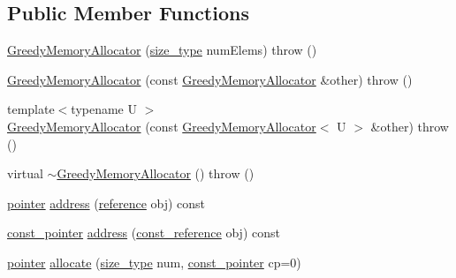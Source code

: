 \subsection*{Public Member Functions}
\begin{DoxyCompactItemize}
\item 
\hyperlink{classuva_1_1smt_1_1tries_1_1alloc_1_1_greedy_memory_allocator_ae87e1efb69523a746d42c2bdff324b6a}{Greedy\+Memory\+Allocator} (\hyperlink{classuva_1_1smt_1_1tries_1_1alloc_1_1_greedy_memory_allocator_a76d81ff5df20ef0404bb2027016b8b2d}{size\+\_\+type} num\+Elems)  throw ()
\item 
\hyperlink{classuva_1_1smt_1_1tries_1_1alloc_1_1_greedy_memory_allocator_a3c3e41759b86df79ce3321386b8dafcd}{Greedy\+Memory\+Allocator} (const \hyperlink{classuva_1_1smt_1_1tries_1_1alloc_1_1_greedy_memory_allocator}{Greedy\+Memory\+Allocator} \&other)  throw ()
\item 
{\footnotesize template$<$typename U $>$ }\\\hyperlink{classuva_1_1smt_1_1tries_1_1alloc_1_1_greedy_memory_allocator_afce20e748e6ecdb3890b2bb373bb755c}{Greedy\+Memory\+Allocator} (const \hyperlink{classuva_1_1smt_1_1tries_1_1alloc_1_1_greedy_memory_allocator}{Greedy\+Memory\+Allocator}$<$ U $>$ \&other)  throw ()
\item 
virtual \hyperlink{classuva_1_1smt_1_1tries_1_1alloc_1_1_greedy_memory_allocator_ad14d50375a544eb20ef5d232ab56ba85}{$\sim$\+Greedy\+Memory\+Allocator} ()  throw ()
\item 
\hyperlink{classuva_1_1smt_1_1tries_1_1alloc_1_1_greedy_memory_allocator_ad82be226faea1278f210654317249483}{pointer} \hyperlink{classuva_1_1smt_1_1tries_1_1alloc_1_1_greedy_memory_allocator_a13768ffe7599dc80f0f75bf55ddf4dbf}{address} (\hyperlink{classuva_1_1smt_1_1tries_1_1alloc_1_1_greedy_memory_allocator_a62f7001b75a49f4711f5b06900642f8b}{reference} obj) const 
\item 
\hyperlink{classuva_1_1smt_1_1tries_1_1alloc_1_1_greedy_memory_allocator_aaa55b155c72c0817936b86c9c11a6ab2}{const\+\_\+pointer} \hyperlink{classuva_1_1smt_1_1tries_1_1alloc_1_1_greedy_memory_allocator_a84868724dd7024e8a52e23bf248dfdab}{address} (\hyperlink{classuva_1_1smt_1_1tries_1_1alloc_1_1_greedy_memory_allocator_a1f74969c0895bf669864b2b28e675386}{const\+\_\+reference} obj) const 
\item 
\hyperlink{classuva_1_1smt_1_1tries_1_1alloc_1_1_greedy_memory_allocator_ad82be226faea1278f210654317249483}{pointer} \hyperlink{classuva_1_1smt_1_1tries_1_1alloc_1_1_greedy_memory_allocator_a4b1061b120ca17a9ada79050c9960134}{allocate} (\hyperlink{classuva_1_1smt_1_1tries_1_1alloc_1_1_greedy_memory_allocator_a76d81ff5df20ef0404bb2027016b8b2d}{size\+\_\+type} num, \hyperlink{classuva_1_1smt_1_1tries_1_1alloc_1_1_greedy_memory_allocator_aaa55b155c72c0817936b86c9c11a6ab2}{const\+\_\+pointer} cp=0)

\end{DoxyCompactItemize}
